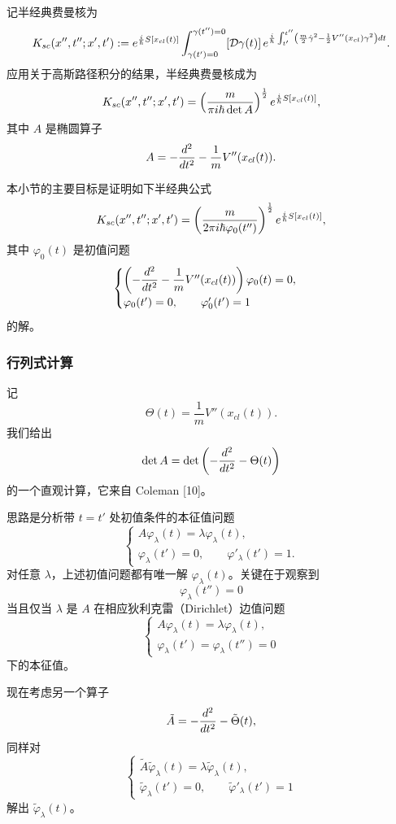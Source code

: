 记半经典费曼核为
\[
K_{sc}(x'',t'';x',t'):=e^{\frac{i}{\hbar}S[x_{cl}(t)]}
\int_{\gamma(t')=0}^{\gamma(t'')=0}[\mathcal{D}\gamma(t)]\,
e^{\frac{i}{\hbar}\int_{t'}^{t''}\left(\frac{m}{2}\dot\gamma^2-\frac12V''(x_{cl})\gamma^2\right)d t}.
\]
应用关于高斯路径积分的结果，半经典费曼核成为
\[
K_{sc}(x'',t'';x',t')=
\left(\frac{m}{\pi i\hbar\det A}\right)^{\frac12}e^{\frac{i}{\hbar}S[x_{cl}(t)]},
\]
其中 $A$ 是椭圆算子
\[
A=-\frac{d^2}{d t^2}-\frac1m V''(x_{cl}(t)).
\]

本小节的主要目标是证明如下半经典公式
\[
K_{sc}(x'',t'';x',t')=
\left(\frac{m}{2\pi i\hbar\varphi_0(t'')}\right)^{\frac12}
e^{\frac{i}{\hbar}S[x_{cl}(t)]},
\]
其中 $\varphi_0(t)$ 是初值问题
\[
\begin{cases}
\left(-\dfrac{d^2}{d t^2}-\dfrac1m V''(x_{cl}(t))\right)\varphi_0(t)=0,\\[2mm]
\varphi_0(t')=0,\qquad \varphi_0'(t')=1
\end{cases}
\]
的解。

\subsubsection*{行列式计算}

记
\[
\Theta(t)=\frac1m V''(x_{cl}(t)).
\]
我们给出
\[
\det A=\det\left(-\frac{d^2}{d t^2}-\Theta(t)\right)
\]
的一个直观计算，它来自 Coleman [10]。

思路是分析带 $t=t'$ 处初值条件的本征值问题
\[
\begin{cases}
A\varphi_\lambda(t)=\lambda\varphi_\lambda(t),\\
\varphi_\lambda(t')=0,\qquad \varphi'_\lambda(t')=1.
\end{cases}
\]
对任意 $\lambda$，上述初值问题都有唯一解 $\varphi_\lambda(t)$。关键在于观察到
\[
\varphi_\lambda(t'')=0
\]
当且仅当 $\lambda$ 是 $A$ 在相应狄利克雷（Dirichlet）边值问题
\[
\begin{cases}
A\varphi_\lambda(t)=\lambda\varphi_\lambda(t),\\
\varphi_\lambda(t')=\varphi_\lambda(t'')=0
\end{cases}
\]
下的本征值。

现在考虑另一个算子
\[
\tilde A=-\frac{d^2}{d t^2}-\tilde\Theta(t),
\]
同样对
\[
\begin{cases}
\tilde A\tilde\varphi_\lambda(t)=\lambda\tilde\varphi_\lambda(t),\\
\tilde\varphi_\lambda(t')=0,\qquad \tilde\varphi'_\lambda(t')=1
\end{cases}
\]
解出 $\tilde\varphi_\lambda(t)$。

